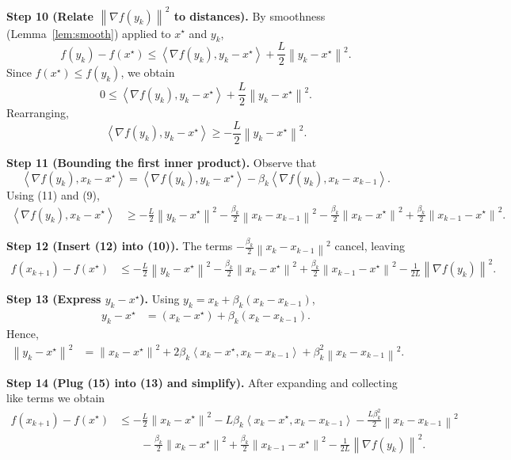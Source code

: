\documentclass{article}
\newcommand{\norm}[1]{\left\lVert#1\right\rVert}
\newcommand{\ip}[2]{\left\langle #1,#2\right\rangle}
\begin{document}
\bigskip
\noindent\textbf{Step 10 (Relate $\norm{\nabla f(y_k)}^2$ to distances).} By smoothness (Lemma~\ref{lem:smooth}) applied to $x^\star$ and $y_k$,
\[
f(y_k)-f(x^\star) \le \ip{\nabla f(y_k)}{y_k-x^\star}
                     +\frac{L}{2}\norm{y_k-x^\star}^2 .
\]
Since $f(x^\star)\le f(y_k)$, we obtain
\[
0 \le \ip{\nabla f(y_k)}{y_k-x^\star}
     +\frac{L}{2}\norm{y_k-x^\star}^2 .
\]
Rearranging,
\[
\ip{\nabla f(y_k)}{y_k-x^\star} \ge -\frac{L}{2}\norm{y_k-x^\star}^2 .
\tag{11}
\]

\bigskip
\noindent\textbf{Step 11 (Bounding the first inner product).} Observe that
\[
\ip{\nabla f(y_k)}{x_k-x^\star}
   = \ip{\nabla f(y_k)}{y_k-x^\star}
     -\beta_k\ip{\nabla f(y_k)}{x_k-x_{k-1}} .
\]
Using (11) and (9),
\[
\begin{aligned}
\ip{\nabla f(y_k)}{x_k-x^\star}
 &\ge -\frac{L}{2}\norm{y_k-x^\star}^2
        -\frac{\beta_k}{2}\norm{x_k-x_{k-1}}^2
        -\frac{\beta_k}{2}\norm{x_k-x^\star}^2
        +\frac{\beta_k}{2}\norm{x_{k-1}-x^\star}^2 .
\end{aligned}
\tag{12}
\]

\bigskip
\noindent\textbf{Step 12 (Insert (12) into (10)).} The terms $-\frac{\beta_k}{2}\norm{x_k-x_{k-1}}^2$ cancel, leaving
\[
\begin{aligned}
f(x_{k+1})-f(x^\star)
 &\le -\frac{L}{2}\norm{y_k-x^\star}^2
      -\frac{\beta_k}{2}\norm{x_k-x^\star}^2
      +\frac{\beta_k}{2}\norm{x_{k-1}-x^\star}^2
      -\frac{1}{2L}\norm{\nabla f(y_k)}^2 .
\end{aligned}
\tag{13}
\]

\bigskip
\noindent\textbf{Step 13 (Express $y_k-x^\star$).} Using $y_k = x_k + \beta_k (x_k-x_{k-1})$,
\[
\begin{aligned}
y_k-x^\star
   &= (x_k-x^\star) + \beta_k (x_k-x_{k-1}) .
\end{aligned}
\tag{14}
\]
Hence,
\[
\begin{aligned}
\norm{y_k-x^\star}^2
   &= \norm{x_k-x^\star}^2
      +2\beta_k\ip{x_k-x^\star}{x_k-x_{k-1}}
      +\beta_k^2\norm{x_k-x_{k-1}}^2 .
\end{aligned}
\tag{15}
\]

\bigskip
\noindent\textbf{Step 14 (Plug (15) into (13) and simplify).} After expanding and collecting like terms we obtain
\[
\begin{aligned}
f(x_{k+1})-f(x^\star)
 &\le -\frac{L}{2}\norm{x_k-x^\star}^2
      -L\beta_k\ip{x_k-x^\star}{x_k-x_{k-1}}
      -\frac{L\beta_k^2}{2}\norm{x_k-x_{k-1}}^2 \\
 &\qquad -\frac{\beta_k}{2}\norm{x_k-x^\star}^2
          +\frac{\beta_k}{2}\norm{x_{k-1}-x^\star}^2
          -\frac{1}{2L}\norm{\nabla f(y_k)}^2 .
\end{aligned}
\tag{16}
\]
\end{document}
